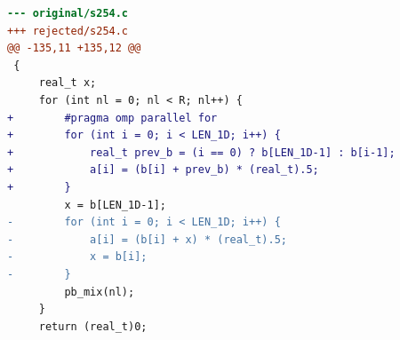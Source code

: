 \begin{lstlisting}[language=diff,basicstyle=\ttfamily\scriptsize,breaklines=true,caption={tsvc/s254 — attempt 2 of 3, rejected by the gate at 'tsan': Race detected: / WARNING: ThreadSanitizer: data race (pid=3333101)}]
--- original/s254.c
+++ rejected/s254.c
@@ -135,11 +135,12 @@
 {
     real_t x;
     for (int nl = 0; nl < R; nl++) {
+        #pragma omp parallel for 
+        for (int i = 0; i < LEN_1D; i++) {
+            real_t prev_b = (i == 0) ? b[LEN_1D-1] : b[i-1];
+            a[i] = (b[i] + prev_b) * (real_t).5;
+        }
         x = b[LEN_1D-1];
-        for (int i = 0; i < LEN_1D; i++) {
-            a[i] = (b[i] + x) * (real_t).5;
-            x = b[i];
-        }
         pb_mix(nl);
     }
     return (real_t)0;
\end{lstlisting}
